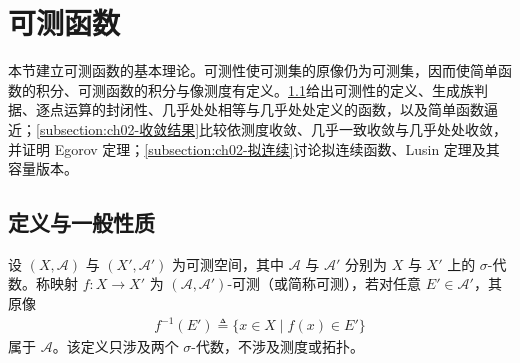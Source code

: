 \documentclass[../../main.tex]{subfiles}%
\begin{document}
\section{可测函数}\label{section:ch02-可测函数}

本节建立可测函数的基本理论。可测性使可测集的原像仍为可测集，因而使简单函数的积分、可测函数的积分与像测度有定义。\cref{subsection:ch02-定义与一般性质}给出可测性的定义、生成族判据、逐点运算的封闭性、几乎处处相等与几乎处处定义的函数，以及简单函数逼近；\cref{subsection:ch02-收敛结果}比较依测度收敛、几乎一致收敛与几乎处处收敛，并证明 Egorov 定理；\cref{subsection:ch02-拟连续}讨论拟连续函数、Lusin 定理及其容量版本。

\subsection{定义与一般性质}\label{subsection:ch02-定义与一般性质}

\begin{definition}\label{definition:ch02-可测函数}\label{definition:ch02-可测性}
设 $(X,\mathscr A)$ 与 $(X',\mathscr A')$ 为可测空间，其中 $\mathscr A$ 与 $\mathscr A'$ 分别为 $X$ 与 $X'$ 上的 $\sigma$-代数。称映射 $f:X\to X'$ 为 $(\mathscr A,\mathscr A')$-可测（或简称可测），若对任意 $E'\in\mathscr A'$，其原像
\begin{align*}
f^{-1}(E')\triangleq\{x\in X\mid f(x)\in E'\}
\end{align*}
属于 $\mathscr A$。该定义只涉及两个 $\sigma$-代数，不涉及测度或拓扑。
\end{definition}
\end{document}
